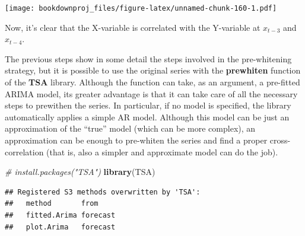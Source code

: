 \documentclass[
]{article}
\newenvironment{Shaded}{\begin{snugshade}}{\end{snugshade}}
\newcommand{\CommentTok}[1]{\textcolor[rgb]{0.56,0.35,0.01}{\textit{#1}}}
\newcommand{\DataTypeTok}[1]{\textcolor[rgb]{0.13,0.29,0.53}{#1}}
\newcommand{\KeywordTok}[1]{\textcolor[rgb]{0.13,0.29,0.53}{\textbf{#1}}}
\newcommand{\NormalTok}[1]{#1}
\newcommand{\OperatorTok}[1]{\textcolor[rgb]{0.81,0.36,0.00}{\textbf{#1}}}
\newcommand{\StringTok}[1]{\textcolor[rgb]{0.31,0.60,0.02}{#1}}
\begin{document}
\begin{Shaded}
\end{Shaded}

\texttt{[image: bookdownproj\_files/figure-latex/unnamed-chunk-160-1.pdf]}

Now, it's clear that the X-variable is correlated with the Y-variable at \(x_{t-3}\) and \(x_{t-4}\).

The previous steps show in some detail the steps involved in the pre-whitening strategy, but it is possible to use the original series with the \textbf{prewhiten} function of the \textbf{TSA} library. Although the function can take, as an argument, a pre-fitted ARIMA model, its greater advantage is that it can take care of all the necessary steps to prewithen the series. In particular, if no model is specified, the library automatically applies a simple AR model. Although this model can be just an approximation of the ``true'' model (which can be more complex), an approximation can be enough to pre-whiten the series and find a proper cross-correlation (that is, also a simpler and approximate model can do the job).

\begin{Shaded}
\begin{Highlighting}[]
\CommentTok{# install.packages("TSA")}
\KeywordTok{library}\NormalTok{(TSA)}
\end{Highlighting}
\end{Shaded}

\begin{verbatim}
## Registered S3 methods overwritten by 'TSA':
##   method       from    
##   fitted.Arima forecast
##   plot.Arima   forecast
\end{verbatim}
\end{document}
